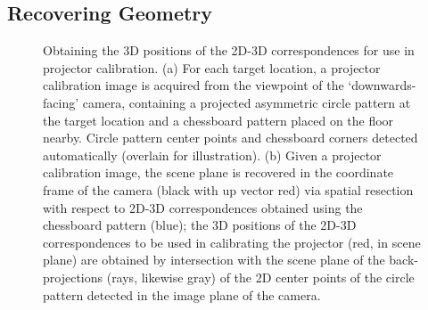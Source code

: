 \documentclass[review]{elsarticle}
\begin{document}
\subsection{Recovering Geometry}\label{sec:approach:geometry}

\begin{figure}[t]
    \centering
    \quad
    \caption{Obtaining the 3D positions of the 2D-3D correspondences for use in projector calibration. (a) For each target location, a projector calibration image is acquired from the viewpoint of the `downwards-facing' camera, containing a projected asymmetric circle pattern at the target location and a chessboard pattern placed on the floor nearby. Circle pattern center points and chessboard corners detected automatically (overlain for illustration). (b) Given a projector calibration image, the scene plane is recovered in the coordinate frame of the camera (black with up vector red) via spatial resection with respect to 2D-3D correspondences obtained using the chessboard pattern (blue); the 3D positions of the 2D-3D correspondences to be used in calibrating the projector (red, in scene plane) are obtained by intersection with the scene plane of the back-projections (rays, likewise gray) of the 2D center points of the circle pattern detected in the image plane of the camera.} %
    \label{fig:2d}
\end{figure}
\end{document}
